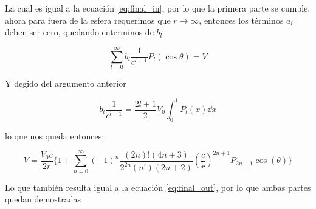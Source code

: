 \documentclass[11pt]{report}
\theoremstyle{plain}
\theoremstyle{definition}
\begin{document}
La cual es igual a la ecuación \ref{eq:final_in}, por lo que la primera parte se cumple, ahora para fuera de la esfera requerimos que $r\rightarrow\infty$, entonces los términos $a_l$ deben ser cero, quedando enterminos de $b_l$

\begin{equation*}
	\sum^\infty_{l=0}b_l\frac{1}{c^{l+1}}P_l(\cos\theta)=V
\end{equation*}

Y degido del argumento anterior

\begin{equation*}
	b_l\frac{1}{c^{l+1}}=\frac{2l+1}{2}V_0\int^1_0P_l(x)\dd{x}
\end{equation*}

lo que nos queda entonces:

\begin{equation*}
	V = \frac{V_0c}{2r}\{ 1 +\sum^\infty_{n=0}(-1)^n \frac{(2n)!(4n+3)}{2^{2n}(n!)(2n+2)}\left(\frac{c}{r}\right)^{2n+1}P_{2n+1}\cos(\theta)\}
\end{equation*}

Lo que también resulta igual a la ecuación \ref{eq:final_out}, por lo que ambas partes quedan demostradas
\end{document}
